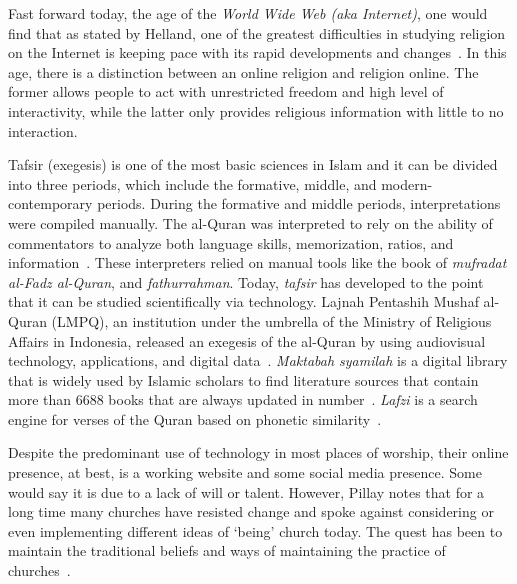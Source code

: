 Fast forward today, the age of the \textit{World Wide Web (aka Internet)}, one would find that as stated by Helland, one of the greatest difficulties in studying religion on the Internet is keeping pace with its rapid developments and changes~\cite{helland}. In this age, there is a distinction between an online religion and religion online. The former allows people to act with unrestricted freedom and high level of interactivity, while the latter only provides religious information with little to no interaction. 

Tafsir (exegesis) is one of the most basic sciences in Islam and it can be divided into three periods, which include the formative, middle, and modern-contemporary periods. During the formative and middle periods, interpretations were compiled manually. The al-Quran was interpreted to rely on the ability of commentators to analyze both language skills, memorization, ratios, and information~\cite{PUTRA2020101418}. These interpreters relied on manual tools like the book of \textit{mufradat al-Fadz al-Quran}, and \textit{fathurrahman}. Today, \textit{tafsir} has developed to the point that it can be studied scientifically via technology. Lajnah Pentashih Mushaf al-Quran (LMPQ), an institution under the umbrella of the Ministry of Religious Affairs in Indonesia, released an exegesis of the al-Quran by using audiovisual technology, applications, and digital data~\cite{PUTRA2020101418}. \textit{Maktabah syamilah} is a digital library that is widely used by Islamic scholars to find literature sources that contain more than 6688 books that are always updated in number~\cite{PUTRA2020101418}. \textit{Lafzi} is a search engine for verses of the Quran based on phonetic similarity~\cite{PUTRA2020101418}.

Despite the predominant use of technology in most places of worship, their online presence, at best, is a working website and some social media presence. Some would say it is due to a lack of will or talent. However, Pillay notes that for a long time many churches have resisted change and spoke against considering or even implementing different ideas of ‘being’ church today. The quest has been to maintain the traditional beliefs and ways of maintaining the practice of churches~\cite{jerry:pillay}.
 






